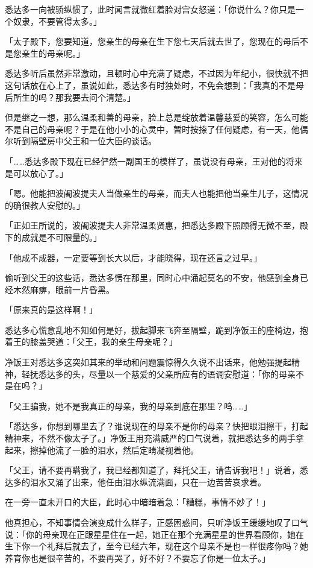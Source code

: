 \documentclass[12pt,twoside,openany]{book}
\begin{document}
悉达多一向被骄纵惯了，此时闻言就微红着脸对宫女怒道：「你说什么？你只是一个奴隶，不要管得太多。」

「太子殿下，您要知道，您亲生的母亲在生下您七天后就去世了，您现在的母后不是您亲生的母亲呢。」

悉达多听后虽然非常激动，且顿时心中充满了疑虑，不过因为年纪小，很快就不把这句话放在心上了，虽说如此，悉达多有时独处时，不免会想到：「我真的不是母后所生的吗？那我要去问个清楚。」

但是继之一想，那么温柔和善的母亲，脸上总是绽放着温馨慈爱的笑容，怎么可能不是自己的母亲呢？于是在他小小的心灵中，暂时按捺了任何疑虑，有一天，他偶尔听到隔壁房中父王和一位大臣的谈话。

「……悉达多殿下现在已经俨然一副国王的模样了，虽说没有母亲，王对他的将来是可以放心了。」

「嗯。他能把波阇波提夫人当做亲生的母亲，而夫人也能把他当亲生儿子，这情况的确很教人安慰的。」

「正如王所说的，波阇波提夫人非常温柔贤惠，把悉达多殿下照顾得无微不至，殿下的成就是不可限量的。」

「他成不成器，一定要等到长大以后，才能晓得，现在还言之过早。」

偷听到父王的这些话，悉达多愣在那里，同时心中涌起莫名的不安，他感到全身已经木然麻痹，眼前一片昏黑。

「原来真的是这样啊！」

悉达多心慌意乱地不知如何是好，拔起脚来飞奔至隔壁，跪到净饭王的座椅边，抱着王的膝盖哭道：「父王，我的亲生母亲呢？」

净饭王对悉达多这突如其来的举动和问题震惊得久久说不出话来，他勉强提起精神，轻抚悉达多的头，尽量以一个慈爱的父亲所应有的语调安慰道：「你的母亲不是在吗？」

「父王骗我，她不是我真正的母亲，我的母亲到底在那里？呜……」

「悉达多，你想到哪里去了？谁说现在的母亲不是你的母亲？快把眼泪擦干，打起精神来，不然不像太子了。」净饭王用充满威严的口气说着，就把悉达多的两手拿起来，擦掉他流了一脸的泪水，然后定睛凝视着他。

「父王，请不要再瞒我了，我已经都知道了，拜托父王，请告诉我吧！」说着，悉达多的泪水又涌了出来，他任由泪水纵流满面，只在一边苦苦哀求着。

在一旁一直未开口的大臣，此时心中暗暗着急：「糟糕，事情不妙了！」

他真担心，不知事情会演变成什么样子，正感困惑间，只听净饭王缓缓地叹了口气说：「你的母亲现在正跟星星住在一起，她正在那个充满星星的世界看顾你，她在生下你一个礼拜后就去了，至今已经六年，现在这个母亲不是也一样很疼你吗？她养育你也是很辛苦的，不要再哭了，好不好？不要忘了你是一位太子。」
\end{document}
